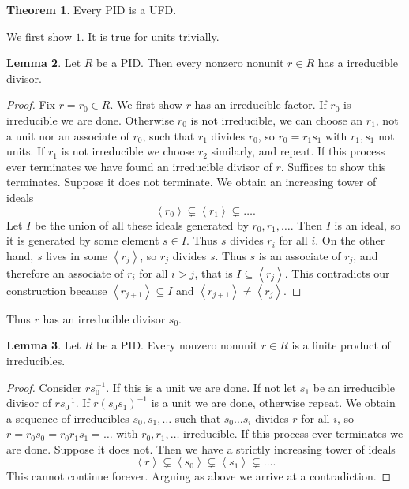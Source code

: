 \documentclass{article}
\newcommand{\rb}[1]{\left( #1 \right)}
\newcommand{\ab}[1]{\left\langle #1 \right\rangle}
\theoremstyle{definition}\newtheorem{definition}{Definition}[subsection]
\theoremstyle{definition}\newtheorem{remark}[definition]{Remark}
\theoremstyle{definition}\newtheorem*{example}{Example}
\theoremstyle{definition}\newtheorem*{note}{Note}
\newtheorem{lemma}[definition]{Lemma}
\newtheorem{theorem}[definition]{Theorem}
\begin{document}
\begin{theorem}
\label{thm:3.3.2}
Every PID is a UFD.
\end{theorem}

We first show $ 1 $. It is true for units trivially.

\begin{lemma}
Let $ R $ be a PID. Then every nonzero nonunit $ r \in R $ has a irreducible divisor.
\end{lemma}

\begin{proof}
Fix $ r = r_0 \in R $. We first show $ r $ has an irreducible factor. If $ r_0 $ is irreducible we are done. Otherwise $ r_0 $ is not irreducible, we can choose an $ r_1 $, not a unit nor an associate of $ r_0 $, such that $ r_1 $ divides $ r_0 $, so $ r_0 = r_1s_1 $ with $ r_1, s_1 $ not units. If $ r_1 $ is not irreducible we choose $ r_2 $ similarly, and repeat. If this process ever terminates we have found an irreducible divisor of $ r $. Suffices to show this terminates. Suppose it does not terminate. We obtain an increasing tower of ideals
$$ \ab{r_0} \subsetneq \ab{r_1} \subsetneq \dots. $$
Let $ I $ be the union of all these ideals generated by $ r_0, r_1, \dots $. Then $ I $ is an ideal, so it is generated by some element $ s \in I $. Thus $ s $ divides $ r_i $ for all $ i $. On the other hand, $ s $ lives in some $ \ab{r_j} $, so $ r_j $ divides $ s $. Thus $ s $ is an associate of $ r_j $, and therefore an associate of $ r_i $ for all $ i > j $, that is $ I \subseteq \ab{r_j} $. This contradicts our construction because $ \ab{r_{j + 1}} \subseteq I $ and $ \ab{r_{j + 1}} \ne \ab{r_j} $.
\end{proof}

Thus $ r $ has an irreducible divisor $ s_0 $.

\begin{lemma}
Let $ R $ be a PID. Every nonzero nonunit $ r \in R $ is a finite product of irreducibles.
\end{lemma}

\begin{proof}
Consider $ rs_0^{-1} $. If this is a unit we are done. If not let $ s_1 $ be an irreducible divisor of $ rs_0^{-1} $. If $ r\rb{s_0s_1}^{-1} $ is a unit we are done, otherwise repeat. We obtain a sequence of irreducibles $ s_0, s_1, \dots $ such that $ s_0 \dots s_i $ divides $ r $ for all $ i $, so $ r = r_0s_0 = r_0r_1s_1 = \dots $ with $ r_0, r_1, \dots $ irreducible. If this process ever terminates we are done. Suppose it does not. Then we have a strictly increasing tower of ideals
$$ \ab{r} \subsetneq \ab{s_0} \subsetneq \ab{s_1} \subsetneq \dots. $$
This cannot continue forever. Arguing as above we arrive at a contradiction.
\end{proof}
\end{document}
